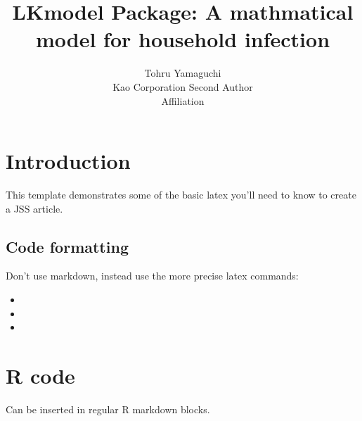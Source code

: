 \documentclass[jss]{jss}
\author{
Tohru Yamaguchi\\Kao Corporation \And Second Author\\Affiliation
}
\title{LKmodel Package: A mathmatical model for household infection
\pkg{LKmodel}}
\begin{document}
\hypertarget{introduction}{%
\section{Introduction}\label{introduction}}

This template demonstrates some of the basic latex you'll need to know
to create a JSS article.

\hypertarget{code-formatting}{%
\subsection{Code formatting}\label{code-formatting}}

Don't use markdown, instead use the more precise latex commands:

\begin{itemize}
\item
\item
\item
\end{itemize}

\hypertarget{r-code}{%
\section{R code}\label{r-code}}

Can be inserted in regular R markdown blocks.
\end{document}
